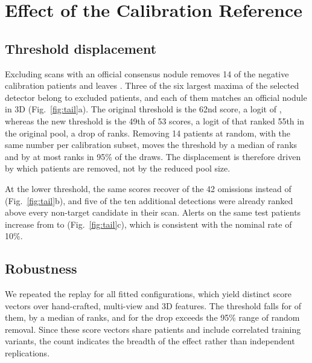 \section{Effect of the Calibration Reference}
\label{sec:tail}

\subsection{Threshold displacement}

Excluding scans with an official consensus nodule removes 14 of the \PCal{} negative calibration patients and leaves \UCal{}. Three of the six largest maxima of the selected detector belong to excluded patients, and each of them matches an official nodule in 3D (Fig.~\ref{fig:tail}a). The original threshold is the 62nd score, a logit of \PairCutoffP{}, whereas the new threshold is the 49th of 53 scores, a logit of \PairCutoffU{} that ranked 55th in the original pool, a drop of \PairDrop{} ranks. Removing 14 patients at random, with the same number per calibration subset, moves the threshold by a median of \PairRobustMedian{} ranks and by at most \PairControlHi{} ranks in 95\% of the draws. The displacement is therefore driven by which patients are removed, not by the reduced pool size.

At the lower threshold, the same scores recover \PairHitsU{} of the 42 omissions instead of \PairHitsP{} (Fig.~\ref{fig:tail}b), and five of the ten additional detections were already ranked above every non-target candidate in their scan. Alerts on the same \UTest{} test patients increase from \PairAlertsP{} to \PairAlertsU{} (Fig.~\ref{fig:tail}c), which is consistent with the nominal rate of 10\%.

\subsection{Robustness}

We repeated the replay for all \NHeadRows{} fitted configurations, which yield \NHeads{} distinct score vectors over hand-crafted, multi-view and 3D features. The threshold falls for \LowerHeads{} of them, by a median of \MedianDrop{} ranks, and for \PastBand{} the drop exceeds the 95\% range of random removal. Since these score vectors share patients and include correlated training variants, the count indicates the breadth of the effect rather than independent replications.

